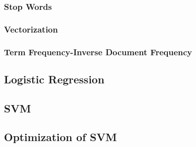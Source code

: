 \documentclass[11pt, a4paper, twocolumn]{article}
\begin{document}
\subsubsection{Stop Words}
\subsubsection{Vectorization}
\subsubsection{Term Frequency-Inverse Document Frequency}

\subsection{Logistic Regression}

\subsection{SVM}

\subsection{Optimization of SVM}
\end{document}
